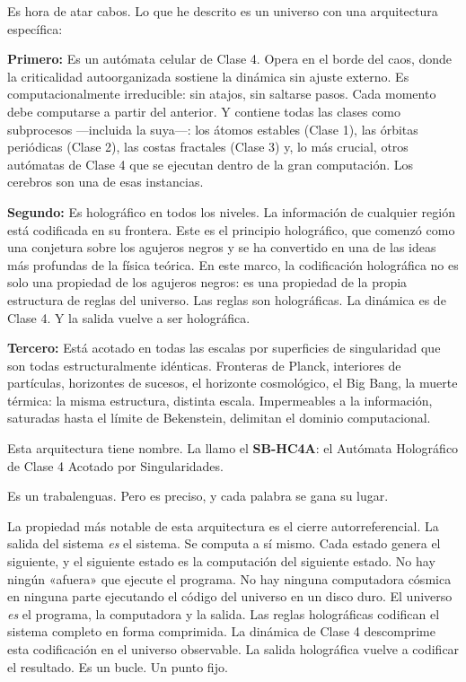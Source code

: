 \documentclass[11pt, twoside, openright]{book}
\begin{document}
Es hora de atar cabos. Lo que he descrito es un universo con una arquitectura específica:

\textbf{Primero:} Es un autómata celular de Clase 4. Opera en el borde del caos, donde la criticalidad autoorganizada sostiene la dinámica sin ajuste externo. Es computacionalmente irreducible: sin atajos, sin saltarse pasos. Cada momento debe computarse a partir del anterior. Y contiene todas las clases como subprocesos ---incluida la suya---: los átomos estables (Clase 1), las órbitas periódicas (Clase 2), las costas fractales (Clase 3) y, lo más crucial, otros autómatas de Clase 4 que se ejecutan dentro de la gran computación. Los cerebros son una de esas instancias.

\textbf{Segundo:} Es holográfico en todos los niveles. La información de cualquier región está codificada en su frontera. Este es el principio holográfico, que comenzó como una conjetura sobre los agujeros negros y se ha convertido en una de las ideas más profundas de la física teórica. En este marco, la codificación holográfica no es solo una propiedad de los agujeros negros: es una propiedad de la propia estructura de reglas del universo. Las reglas son holográficas. La dinámica es de Clase 4. Y la salida vuelve a ser holográfica.

\textbf{Tercero:} Está acotado en todas las escalas por superficies de singularidad que son todas estructuralmente idénticas. Fronteras de Planck, interiores de partículas, horizontes de sucesos, el horizonte cosmológico, el Big Bang, la muerte térmica: la misma estructura, distinta escala. Impermeables a la información, saturadas hasta el límite de Bekenstein, delimitan el dominio computacional.

Esta arquitectura tiene nombre. La llamo el \textbf{SB-HC4A}: el Autómata Holográfico de Clase 4 Acotado por Singularidades.

Es un trabalenguas. Pero es preciso, y cada palabra se gana su lugar.

La propiedad más notable de esta arquitectura es el cierre autorreferencial. La salida del sistema \textit{es} el sistema. Se computa a sí mismo. Cada estado genera el siguiente, y el siguiente estado es la computación del siguiente estado. No hay ningún «afuera» que ejecute el programa. No hay ninguna computadora cósmica en ninguna parte ejecutando el código del universo en un disco duro. El universo \textit{es} el programa, la computadora y la salida. Las reglas holográficas codifican el sistema completo en forma comprimida. La dinámica de Clase 4 descomprime esta codificación en el universo observable. La salida holográfica vuelve a codificar el resultado. Es un bucle. Un punto fijo.
\end{document}
